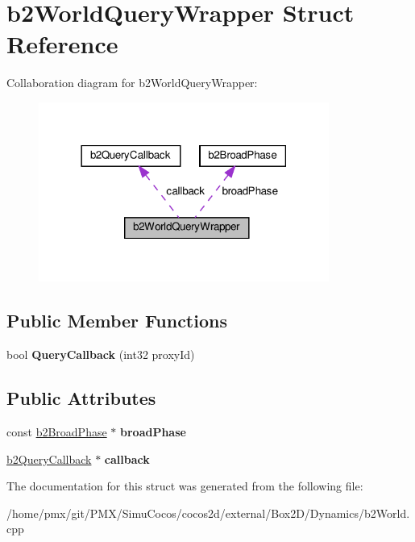 \hypertarget{structb2WorldQueryWrapper}{}\section{b2\+World\+Query\+Wrapper Struct Reference}
\label{structb2WorldQueryWrapper}


Collaboration diagram for b2\+World\+Query\+Wrapper\+:
\nopagebreak
\begin{figure}[H]
\begin{center}
\leavevmode
\includegraphics[width=270pt]{structb2WorldQueryWrapper__coll__graph}
\end{center}
\end{figure}
\subsection*{Public Member Functions}
\begin{DoxyCompactItemize}
\item 
\mbox{\label{structb2WorldQueryWrapper_a660a482e5a15b7f40a103b2dfb1711c1}} 
bool {\bfseries Query\+Callback} (int32 proxy\+Id)
\end{DoxyCompactItemize}
\subsection*{Public Attributes}
\begin{DoxyCompactItemize}
\item 
\mbox{\label{structb2WorldQueryWrapper_ab85c542cfaf43d2ecf31fcbfd8c0c792}} 
const \hyperlink{classb2BroadPhase}{b2\+Broad\+Phase} $\ast$ {\bfseries broad\+Phase}
\item 
\mbox{\label{structb2WorldQueryWrapper_a3af9f06dfa228974fecabd2bb2b07d2e}} 
\hyperlink{classb2QueryCallback}{b2\+Query\+Callback} $\ast$ {\bfseries callback}
\end{DoxyCompactItemize}


The documentation for this struct was generated from the following file\+:\begin{DoxyCompactItemize}
\item 
/home/pmx/git/\+P\+M\+X/\+Simu\+Cocos/cocos2d/external/\+Box2\+D/\+Dynamics/b2\+World.\+cpp\end{DoxyCompactItemize}
